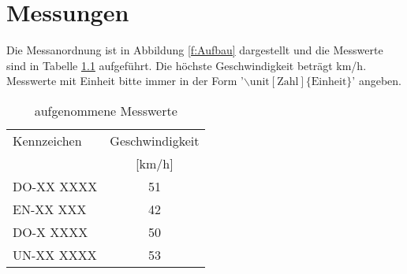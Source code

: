 \chapter{Messungen}
\label{c:Messungen}

Die Messanordnung ist in Abbildung \ref{f:Aufbau} dargestellt und die Messwerte sind in Tabelle \ref{t:Messwerte} aufgef\"uhrt. Die h\"ochste Geschwindigkeit betr\"agt \unit[53]{km/h}. Messwerte mit Einheit bitte immer in der
Form '$\mathrm{\backslash unit[Zahl]\{Einheit\}}$' angeben.



\begin{table}[!h]
\caption{aufgenommene Messwerte}
\label{t:Messwerte}
\vspace{2pt}
\begin{center}
\begin{tabular}{|l c|}
\hline
Kennzeichen & Geschwindigkeit\\
& [km/h] \\
\hline
\hline
DO-XX XXXX & 51\\
EN-XX  XXX & 42\\
DO-X  XXXX & 50\\
UN-XX XXXX & 53\\
\hline
\end{tabular}
\end{center}
\end{table}
